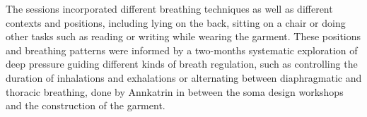 

The sessions incorporated different breathing techniques as well as different contexts and positions, including lying on the back, sitting on a chair or doing other tasks such as reading or writing while wearing the garment. These positions and breathing patterns were informed by a two-months systematic exploration of deep pressure guiding different kinds of breath regulation, such as controlling the duration of inhalations and exhalations or alternating between diaphragmatic and thoracic breathing, done by Annkatrin in between the soma design workshops and the construction of the garment.

